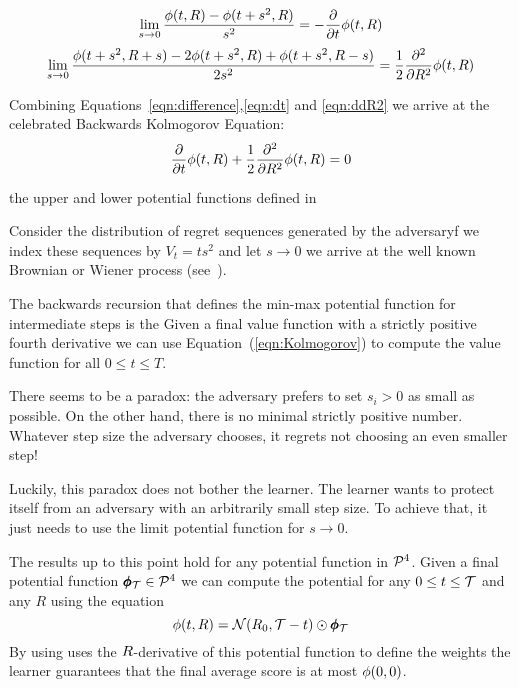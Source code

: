 \documentclass[anon,12pt]{colt2024} %
\begin{document}
 \begin{equation}
   \lim_{s \to 0}\frac{\phi(t, R)  - \phi(t+s^2,R)}{s^2} =  -\frac{\partial}{\partial t} \phi(t,R)
   \label{eqn:dt}
   \end{equation}
 \begin{equation}
   \lim_{s \to 0}
   \frac{\phi(t+s^2,R+s) - 2\phi(t+s^2,R)+\phi(t+s^2,R-s)}{2s^2}
   =  \frac{1}{2} \frac{\partial^2}{\partial R^2} \phi(t,R)
\label{eqn:ddR2}
 \end{equation}

Combining Equations~\ref{eqn:difference},\ref{eqn:dt} and \ref{eqn:ddR2} we arrive at the  
 celebrated Backwards Kolmogorov Equation:
\begin{equation} \label{eqn:Kolmogorov}
  \frac{\partial}{\partial t} \phi(t,R)
  + \frac{1}{2} \frac{\partial^2}{\partial R^2} \phi(t,R)=0
\end{equation}

the upper and lower
potential functions defined in

Consider the distribution of regret sequences generated by the adversaryf we index these sequences by $V_t = ts^2$ and let $s \to 0$ we arrive at the well known Brownian or Wiener process
(see~\cite{kac1947random}).

The backwards recursion that defines the min-max potential function
for intermediate steps is the 
Given a final value function with a strictly positive fourth
derivative we can use Equation~(\ref{eqn:Kolmogorov}) to compute the
value function for all $0 \leq t \leq T$. 

There seems to be a paradox: the adversary prefers to set $s_i>0$ as
small as possible. On the other hand, there is no minimal strictly
positive number. Whatever step size the adversary chooses, it regrets
not choosing an even smaller step!

Luckily, this paradox does not bother the learner. The learner wants
to protect itself from an adversary with an arbitrarily small step
size. To achieve that, it just needs to use the limit potential function for $s \to 0$.

The results up to this point hold for any potential function in
${\cal P}^{4}$. Given a final potential function $\pmb{\phi}_{\mathcal{T}} \in {\cal P}^{4}$ we
can compute the potential for any $0 \leq t \leq \mathcal{T}$ and any $R$ using the equation 
\begin{equation} \label{eqn:convol-with-normal}
\phi(t,R)={\cal N}(R_0,\mathcal{T}-t) \odot \pmb{\phi}_{\mathcal{T}}
\end{equation}
By using uses the $R$-derivative of this potential function to define
the weights the learner guarantees that the final average score is at
most $\phi(0,0)$.
\end{document}
